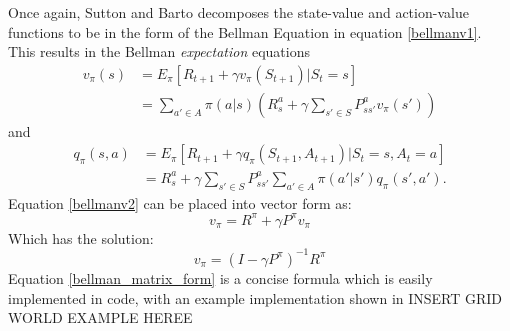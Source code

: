 Once again, Sutton and Barto \cite{sutton_barto} decomposes the state-value and action-value functions to be in the form of the Bellman Equation in equation \ref{bellmanv1}. This results in the Bellman \textit{expectation} equations
\begin{align}
	v_{\pi}(s)	&= E_{\pi}[R_{t+1} + \gamma v_{\pi}(S_{t+1})|S_t = s]\\
	&= \sum_{a'\in A}\pi(a|s)(R^{a}_s+\gamma\sum_{s'\in S}P^{a}_{ss'}v_\pi(s'))
	\label{bellmanv2}
\end{align}
and
\begin{align}
	q_{\pi}(s,a)	&= E_{\pi}[R_{t+1} + \gamma q_{\pi}(S_{t+1},A_{t+1})|S_t = s,A_t = a]\\
	&= R^{a}_s +\gamma \sum_{s'\in S}P^{a}_{ss'}\sum_{a'\in A}\pi(a'|s')q_\pi(s',a').
	\label{bellmanq}
\end{align}
Equation \ref{bellmanv2} can be placed into vector form as:
\begin{equation}
	v_\pi = R^{\pi} + \gamma P^{\pi}v_\pi
\end{equation}
Which has the solution:
\begin{equation}
	v_\pi = (I - \gamma P^{\pi})^{-1}R^{\pi}
	\label{bellman_matrix_form}
\end{equation}
Equation \ref{bellman_matrix_form} is a concise formula which is easily implemented in code, with an example implementation shown in {\color{red} \huge{INSERT GRID WORLD EXAMPLE HEREE}}

